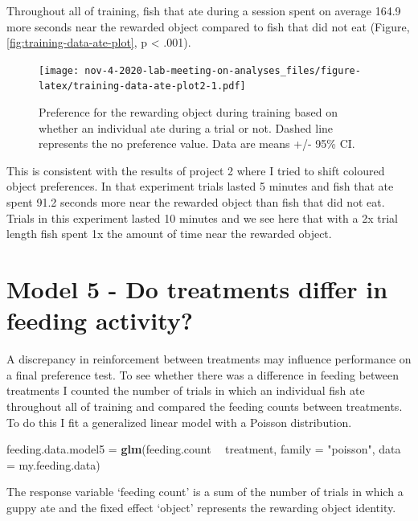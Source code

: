 \documentclass[]{book}
\newenvironment{Shaded}{\begin{snugshade}}{\end{snugshade}}
\newcommand{\KeywordTok}[1]{\textcolor[rgb]{0.13,0.29,0.53}{\textbf{#1}}}
\newcommand{\DataTypeTok}[1]{\textcolor[rgb]{0.13,0.29,0.53}{#1}}
\newcommand{\StringTok}[1]{\textcolor[rgb]{0.31,0.60,0.02}{#1}}
\newcommand{\OperatorTok}[1]{\textcolor[rgb]{0.81,0.36,0.00}{\textbf{#1}}}
\newcommand{\NormalTok}[1]{#1}
\begin{document}
Throughout all of training, fish that ate during a session spent on
average 164.9 more seconds near the rewarded object compared to fish
that did not eat (Figure, \ref{fig:training-data-ate-plot}, p
\textless{} .001).

\begin{figure}
\centering
\texttt{[image: nov-4-2020-lab-meeting-on-analyses\_files/figure-latex/training-data-ate-plot2-1.pdf]}
\caption{\label{fig:training-data-ate-plot2}Preference for the rewarding
object during training based on whether an individual ate during a trial
or not. Dashed line represents the no preference value. Data are means
+/- 95\% CI.}
\end{figure}

This is consistent with the results of project 2 where I tried to shift
coloured object preferences. In that experiment trials lasted 5 minutes
and fish that ate spent 91.2 seconds more near the rewarded object than
fish that did not eat. Trials in this experiment lasted 10 minutes and
we see here that with a 2x trial length fish spent 1x the amount of time
near the rewarded object.

\chapter{Model 5 - Do treatments differ in feeding
activity?}\label{model-5---do-treatments-differ-in-feeding-activity}

A discrepancy in reinforcement between treatments may influence
performance on a final preference test. To see whether there was a
difference in feeding between treatments I counted the number of trials
in which an individual fish ate throughout all of training and compared
the feeding counts between treatments. To do this I fit a generalized
linear model with a Poisson distribution.

\begin{Shaded}
\begin{Highlighting}[]
\NormalTok{feeding.data.model5 =}\StringTok{ }
\StringTok{  }\KeywordTok{glm}\NormalTok{(feeding.count }\OperatorTok{~}\StringTok{ }\NormalTok{treatment, }\DataTypeTok{family =} \StringTok{"poisson"}\NormalTok{, }
      \DataTypeTok{data =}\NormalTok{ my.feeding.data)}
\end{Highlighting}
\end{Shaded}

The response variable `feeding count' is a sum of the number of trials
in which a guppy ate and the fixed effect `object' represents the
rewarding object identity.
\end{document}
